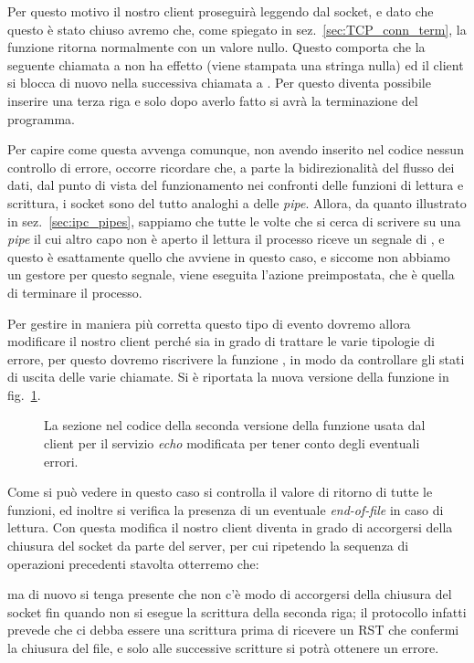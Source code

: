 Per questo motivo il nostro client proseguirà leggendo dal socket, e dato che
questo è stato chiuso avremo che, come spiegato in
sez.~\ref{sec:TCP_conn_term}, la funzione  ritorna normalmente con
un valore nullo. Questo comporta che la seguente chiamata a  non
ha effetto (viene stampata una stringa nulla) ed il client si blocca di nuovo
nella successiva chiamata a . Per questo diventa possibile
inserire una terza riga e solo dopo averlo fatto si avrà la terminazione del
programma.

Per capire come questa avvenga comunque, non avendo inserito nel codice nessun
controllo di errore, occorre ricordare che, a parte la bidirezionalità del
flusso dei dati, dal punto di vista del funzionamento nei confronti delle
funzioni di lettura e scrittura, i socket sono del tutto analoghi a delle
\textit{pipe}. Allora, da quanto illustrato in sez.~\ref{sec:ipc_pipes},
sappiamo che tutte le volte che si cerca di scrivere su una \textit{pipe} il
cui altro capo non è aperto il lettura il processo riceve un segnale di
, e questo è esattamente quello che avviene in questo caso, e
siccome non abbiamo un gestore per questo segnale, viene eseguita l'azione
preimpostata, che è quella di terminare il processo.

Per gestire in maniera più corretta questo tipo di evento dovremo allora
modificare il nostro client perché sia in grado di trattare le varie tipologie
di errore, per questo dovremo riscrivere la funzione , in
modo da controllare gli stati di uscita delle varie chiamate. Si è riportata
la nuova versione della funzione in fig.~\ref{fig:TCP_ClientEcho_second}.

\begin{figure}[!htb]
  \footnotesize \centering
  \begin{minipage}[c]{\codesamplewidth}
  \end{minipage} 
  \normalsize
  \caption{La sezione nel codice della seconda versione della funzione
     usata dal client per il servizio \textit{echo}
    modificata per tener conto degli eventuali errori.}
  \label{fig:TCP_ClientEcho_second}
\end{figure}

Come si può vedere in questo caso si controlla il valore di ritorno di tutte
le funzioni, ed inoltre si verifica la presenza di un eventuale
\textit{end-of-file} in caso di lettura. Con questa modifica il nostro client
 diventa in grado di accorgersi della chiusura del socket da parte
del server, per cui ripetendo la sequenza di operazioni precedenti stavolta
otterremo che:
ma di nuovo si tenga presente che non c'è modo di accorgersi della chiusura
del socket fin quando non si esegue la scrittura della seconda riga; il
protocollo infatti prevede che ci debba essere una scrittura prima di ricevere
un RST che confermi la chiusura del file, e solo alle successive scritture si
potrà ottenere un errore.

